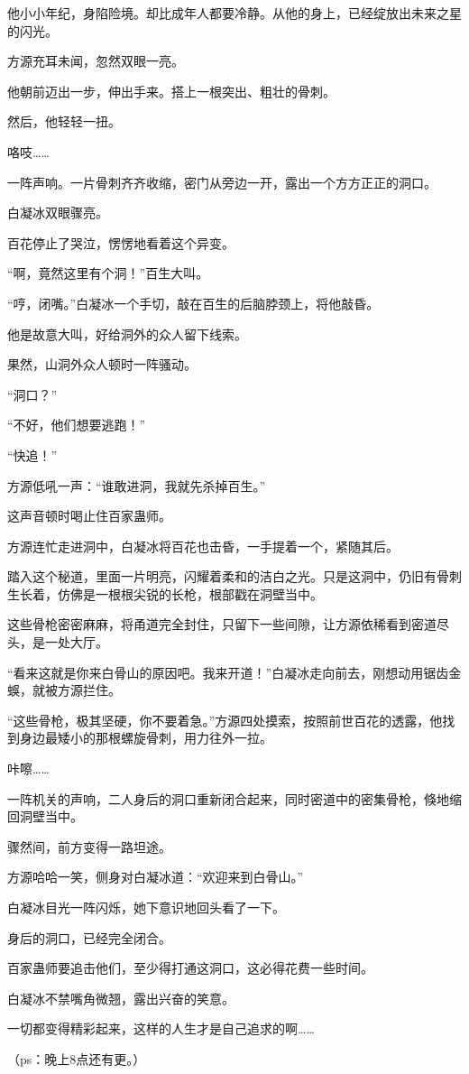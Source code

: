 \begin{this_body}
他小小年纪，身陷险境。却比成年人都要冷静。从他的身上，已经绽放出未来之星的闪光。

方源充耳未闻，忽然双眼一亮。

他朝前迈出一步，伸出手来。搭上一根突出、粗壮的骨刺。

然后，他轻轻一扭。

咯吱……

一阵声响。一片骨刺齐齐收缩，密门从旁边一开，露出一个方方正正的洞口。

白凝冰双眼骤亮。

百花停止了哭泣，愣愣地看着这个异变。

“啊，竟然这里有个洞！”百生大叫。

“哼，闭嘴。”白凝冰一个手切，敲在百生的后脑脖颈上，将他敲昏。

他是故意大叫，好给洞外的众人留下线索。

果然，山洞外众人顿时一阵骚动。

“洞口？”

“不好，他们想要逃跑！”

“快追！”

方源低吼一声：“谁敢进洞，我就先杀掉百生。”

这声音顿时喝止住百家蛊师。

方源连忙走进洞中，白凝冰将百花也击昏，一手提着一个，紧随其后。

踏入这个秘道，里面一片明亮，闪耀着柔和的洁白之光。只是这洞中，仍旧有骨刺生长着，仿佛是一根根尖锐的长枪，根部戳在洞壁当中。

这些骨枪密密麻麻，将甬道完全封住，只留下一些间隙，让方源依稀看到密道尽头，是一处大厅。

“看来这就是你来白骨山的原因吧。我来开道！”白凝冰走向前去，刚想动用锯齿金蜈，就被方源拦住。

“这些骨枪，极其坚硬，你不要着急。”方源四处摸索，按照前世百花的透露，他找到身边最矮小的那根螺旋骨刺，用力往外一拉。

咔嚓……

一阵机关的声响，二人身后的洞口重新闭合起来，同时密道中的密集骨枪，倏地缩回洞壁当中。

骤然间，前方变得一路坦途。

方源哈哈一笑，侧身对白凝冰道：“欢迎来到白骨山。”

白凝冰目光一阵闪烁，她下意识地回头看了一下。

身后的洞口，已经完全闭合。

百家蛊师要追击他们，至少得打通这洞口，这必得花费一些时间。

白凝冰不禁嘴角微翘，露出兴奋的笑意。

一切都变得精彩起来，这样的人生才是自己追求的啊……

（ps：晚上8点还有更。）

\end{this_body}

